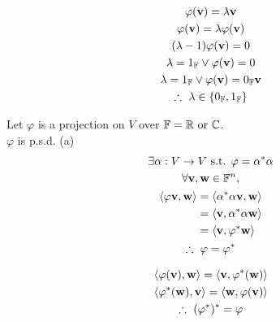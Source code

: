 \documentclass{mathtoolkit}
\begin{document}
\begin{p}
  \item
    \begin{subp}
      \item
        \begin{gather*}
          \varphi(\vec{v}) = \lambda \vec{v} \\
          \varphi(\vec{v}) = \lambda \varphi(\vec{v}) \\
          (\lambda - 1) \varphi(\vec{v}) = 0 \\
          \lambda = 1_\field{F} \vee \varphi(\vec{v}) = 0 \\
          \lambda = 1_\field{F} \vee \varphi(\vec{v}) = 0_\field{F} \vec{v} \\
          \therefore \lambda \in \left\{ 0_\field{F}, 1_\field{F} \right\}
        \end{gather*}

      \item
        Let $\varphi$ is a projection on $V$ over $\field{F} = \field{R} \text{or} \field{C}$. \\
        $\varphi$ is p.s.d. \because (a) \\
        \begin{gather*}
          \exists \alpha : V \rightarrow V \st \varphi = \alpha^* \alpha \\
          \forall \vec{v}, \vec{w} \in \field{F}^n, \\
          \begin{aligned}
            \ip{\varphi \vec{v}}{\vec{w}} & = \ip{\alpha^*\alpha\vec{v}}{\vec{w}} \\
                                          & = \ip{\vec{v}}{\alpha^*\alpha\vec{w}} \\
                                          & = \ip{\vec{v}}{\varphi^*\vec{w}}
          \end{aligned} \\
          \therefore \varphi = \varphi^*
        \end{gather*}
    \end{subp}

  \item
    \begin{subp}
      \item
        \begin{gather*}
          \ip{\varphi(\vec{v})}{\vec{w}} = \ip{\vec{v}}{\varphi^*(\vec{w})} \\
          \ip{\varphi^*(\vec{w})}{\vec{v}} = \ip{\vec{w}}{\varphi(\vec{v})} \\
          \therefore (\varphi^*)^* = \varphi
        \end{gather*}


\end{subp}
\end{p}
\end{document}
